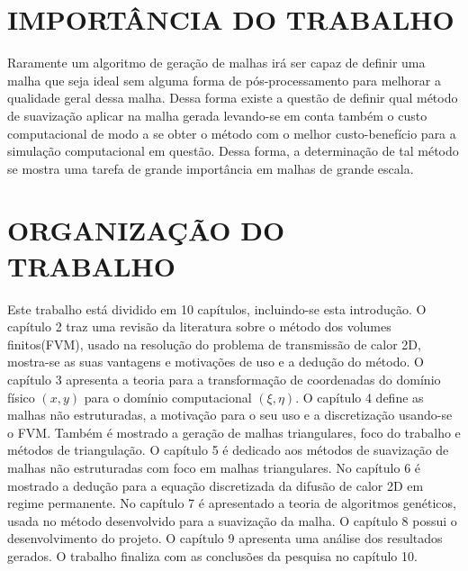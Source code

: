\section{IMPORTÂNCIA DO TRABALHO}

Raramente um algoritmo de geração de malhas irá ser capaz de definir uma malha que seja ideal sem alguma forma de pós-processamento para melhorar a qualidade geral dessa malha. \cite{Salama} Dessa forma existe a questão de definir qual método de suavização aplicar na malha gerada levando-se em conta também o custo computacional de modo a se obter o método com o melhor custo-benefício para a simulação computacional em questão. Dessa forma, a determinação de tal método se mostra uma tarefa de grande importância em malhas de grande escala.

\section{ORGANIZAÇÃO DO TRABALHO}

Este trabalho está dividido em 10 capítulos, incluindo-se esta introdução.
O capítulo 2 traz uma revisão da literatura sobre o método dos volumes finitos(FVM), usado na resolução do problema de transmissão de calor 2D, mostra-se as suas vantagens e motivações de uso e a dedução do método.
O capítulo 3 apresenta a teoria para a transformação de coordenadas do domínio físico $(x,y)$ para o domínio computacional $(\xi,\eta)$.
O capítulo 4 define as malhas não estruturadas, a motivação para o seu uso e a discretização usando-se o FVM. Também é mostrado a geração de malhas triangulares, foco do trabalho e métodos de triangulação.
O capítulo 5 é dedicado aos métodos de suavização de malhas não estruturadas com foco em malhas triangulares.
No capítulo 6 é mostrado a dedução para a equação discretizada da difusão de calor 2D em regime permanente.
No capítulo 7 é apresentado a teoria de algoritmos genéticos, usada no método desenvolvido para a suavização da malha.
O capítulo 8 possui o desenvolvimento do projeto.
O capítulo 9 apresenta uma análise dos resultados gerados.
O trabalho finaliza com as conclusões da pesquisa no capítulo 10.




